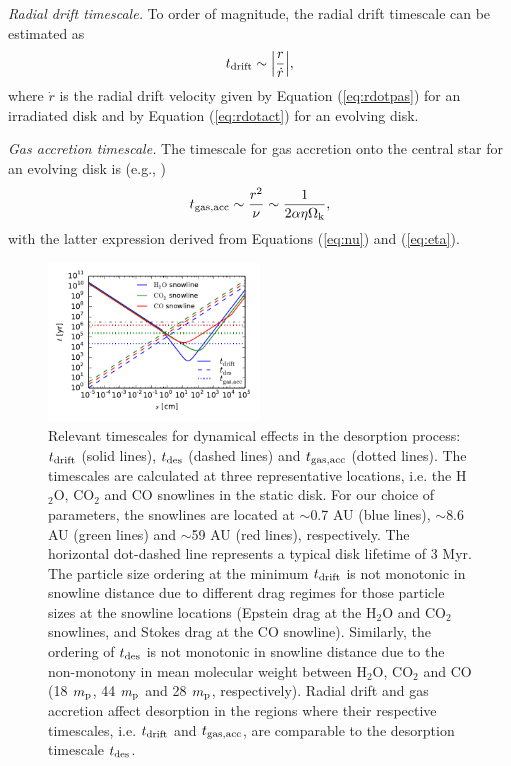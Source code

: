 \documentclass[apj]{emulateapj}
\begin{document}
\textit{Radial drift timescale.} To order of magnitude, the radial drift timescale can be estimated as 
\begin{equation}
\label{eq:tdrift}
t_{\rm drift} \sim \Big|\frac{r}{\dot{r}}\Big|,
\end{equation}
where $\dot{r}$ is the radial drift velocity given by Equation (\ref{eq:rdotpas}) for an irradiated disk and by Equation (\ref{eq:rdotact}) for an evolving disk.

\textit{Gas accretion timescale.} The timescale for gas accretion onto the central star for an evolving disk is (e.g., \citealt{armitage10})
\begin{equation}
\label{eq:tgas}
t_{\rm gas, acc} \sim \frac{r^2}{\nu} \sim \frac{1}{2 \alpha \eta \Omega_{\rm k}},
\end{equation}
with the latter expression derived from Equations (\ref{eq:nu}) and (\ref{eq:eta}).

\begin{figure}[h!]
\centering
\includegraphics[width=0.5\textwidth]{drift_timescales_betaS1_gas_acc_new.pdf}
\caption{Relevant timescales for dynamical effects in the desorption process: $t_{\rm drift}$ (solid lines), $t_{\rm des}$ (dashed lines) and $t_{\rm gas, acc}$ (dotted lines). The timescales are calculated at three representative locations, i.e. the H$_2$O, CO$_2$ and CO snowlines in the static disk. For our choice of parameters, the snowlines are located at $\sim$0.7 AU (blue lines), $\sim$8.6 AU (green lines) and $\sim$59 AU (red lines), respectively. The horizontal dot-dashed line represents a typical disk lifetime of 3 Myr. The particle size ordering at the minimum $t_{\rm drift}$ is not monotonic in snowline distance due to different drag regimes for those particle sizes at the snowline locations (Epstein drag at the H$_2$O and CO$_2$ snowlines, and Stokes drag at the CO snowline). Similarly, the ordering of $t_{\rm des}$ is not monotonic in snowline distance due to the non-monotony in mean molecular weight between H$_2$O, CO$_2$ and CO (18 $m_{\rm p}$, 44 $m_{\rm p}$ and 28 $m_{\rm p}$, respectively). Radial drift and gas accretion affect desorption in the regions where their respective timescales, i.e. $t_{\rm drift}$ and $t_{\rm gas, acc}$, are comparable to the desorption timescale $t_{\rm des}$.} 
\label{fig:timescales}
\end{figure}
\end{document}
